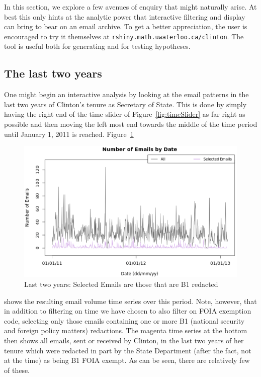 \documentclass[journal]{vgtc}                %
\begin{document}
In this section, we explore a few avenues of enquiry that might naturally arise.  At best this only hints at the analytic power that interactive filtering and display can bring to bear on an email archive.  To get a better appreciation, the user is encouraged to try it themselves at \texttt{rshiny.math.uwaterloo.ca/clinton}.  The tool is useful both for generating and for testing hypotheses.

\subsection{The last two years}
One might begin an interactive analysis by looking at the email patterns in the last two years of Clinton's tenure as Secretary of State.  This is done by simply having the right end of the time slider of Figure~\ref{fig:timeSlider} as far right as possible and then moving the left most end towards the middle of the time period until January 1, 2011 is reached.  Figure~\ref{fig:lastTwoYears} 
\begin{figure}[h]
\begin{center}
\includegraphics[width=0.95\linewidth]{EmailVolumeB1LastTwoYears}
\caption{Last two years:  Selected Emails are those that are B1 redacted}
\label{fig:lastTwoYears}
\end{center}
\end{figure}
shows the resulting email volume time series over this period.  Note, however, that in addition to filtering on time we have chosen to also filter on FOIA exemption code, selecting only those emails containing one or more B1 (national security and foreign policy matters) redactions.  The magenta time series at the bottom then shows all emails, sent or received by Clinton, in the last two years of her tenure which were redacted in part by the State Department (after the fact, not at the time) as being B1 FOIA exempt.  As can be seen, there are relatively few of these.
\end{document}
